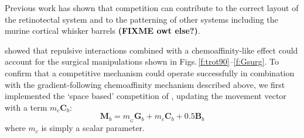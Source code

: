 \documentclass[11pt, a4paper, draft]{article}
\begin{document}
Previous work has shown that competition can contribute to the correct layout
of the retinotectal system \citep{stuff} and to the patterning of other
systems including the murine cortical whisker
barrels \citep{james_modelling_2020} \textbf{(FIXME owt else?)}.

\citet{simpson_simple_2011} showed that repulsive interactions combined with a
chemoaffinity-like effect could account for the surgical manipulations shown
in Figs.\,\ref{f:trot90}--\ref{f:Gsurg}. To confirm that a competitive
mechanism could operate successfully in combination with the
gradient-following chemoaffinity mechanism described above, we first
implemented the `space based' competition of \citet{simpson_simple_2011},
updating the movement vector with a term $m_c \mathbf{C}_b$:
\begin{equation} \label{e:mv2}
 \mathbf{M}_{b} = m_{\!_G} \mathbf{G}_b +  m_c \mathbf{C}_b + 0.5 \mathbf{B}_b
\end{equation}
where $m_c$ is simply a scalar parameter.
%
%
%
%
\end{document}
